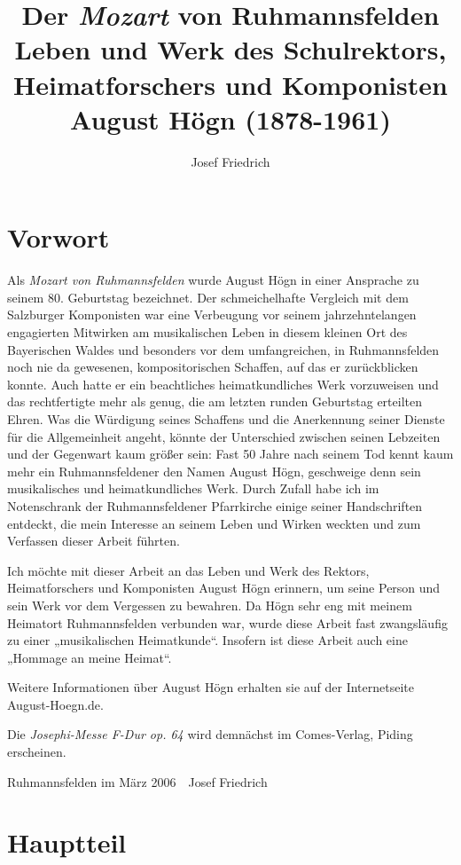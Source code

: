 \documentclass{book}
\title{%
 Der \textit{Mozart} von Ruhmannsfelden\newline%
 \large%
 Leben und Werk des Schulrektors, Heimatforschers
 und Komponisten August Högn (1878-1961)
}
\author{Josef Friedrich}
\begin{document}
\maketitle

\tableofcontents

\chapter{Vorwort}

Als \textit{Mozart von Ruhmannsfelden} wurde August Högn in einer
Ansprache zu seinem 80. Geburtstag bezeichnet. Der schmeichelhafte
Vergleich mit dem Salzburger Komponisten war eine Verbeugung vor seinem
jahrzehntelangen engagierten Mitwirken am musikalischen Leben in diesem
kleinen Ort des Bayerischen Waldes und besonders vor dem umfangreichen,
in Ruhmannsfelden noch nie da gewesenen, kompositorischen Schaffen, auf
das er zurückblicken konnte. Auch hatte er ein beachtliches
heimatkundliches Werk vorzuweisen und das rechtfertigte mehr als genug,
die am letzten runden Geburtstag erteilten Ehren. Was die Würdigung
seines Schaffens und die Anerkennung seiner Dienste für die
Allgemeinheit angeht, könnte der Unterschied zwischen seinen Lebzeiten
und der Gegenwart kaum größer sein: Fast 50 Jahre nach seinem Tod
kennt kaum mehr ein Ruhmannsfeldener den Namen August Högn, geschweige
denn sein musikalisches und heimatkundliches Werk. Durch Zufall habe
ich im Notenschrank der Ruhmannsfeldener Pfarrkirche einige seiner
Handschriften entdeckt, die mein Interesse an seinem Leben und Wirken
weckten und zum Verfassen dieser Arbeit führten.

Ich möchte mit dieser Arbeit an das Leben und Werk des Rektors,
Hei\-matforschers und Komponisten August Högn erinnern, um seine Person
und sein Werk vor dem Vergessen zu bewahren. Da Högn sehr eng mit
meinem Heimatort Ruhmannsfelden verbunden war, wurde diese Arbeit fast
zwangs\-läufig zu einer „musikalischen Heimatkunde“. Insofern ist diese
Arbeit auch eine „Hommage an meine Heimat“.

Weitere Informationen über August Högn erhalten sie auf der
Internetseite August-Hoegn.de.

Die \textit{Josephi-Messe F-Dur op. 64} wird demnächst im Comes-Verlag,
Piding erscheinen. 

Ruhmannsfelden im März 2006\ \ Josef Friedrich

\chapter{Hauptteil}
\end{document}

